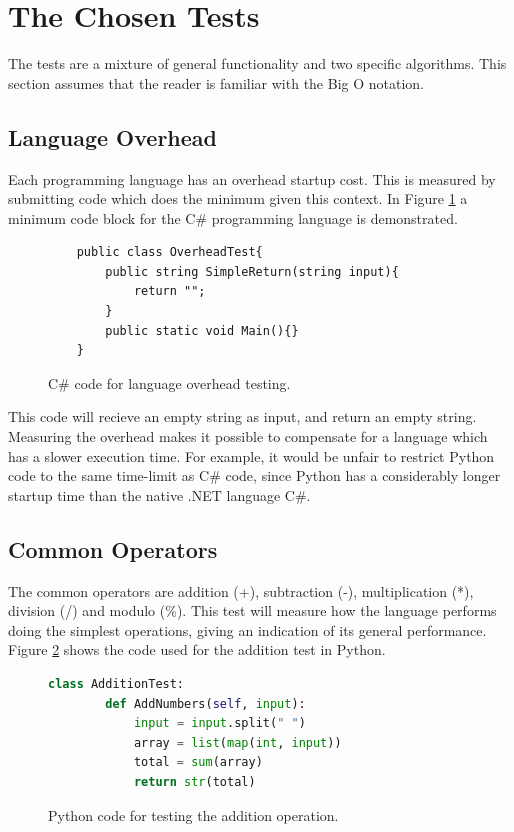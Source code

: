 \section{The Chosen Tests}
The tests are a mixture of general functionality and two specific algorithms. This section assumes that the reader is familiar with the Big O notation.

\subsection{Language Overhead}
Each programming language has an overhead startup cost. This is measured by submitting code which does the minimum given this context. In Figure \ref{fig:language_overhead} a minimum code block for the C\# programming language is demonstrated.

\begin{figure}[h]
	\lstset{style=sharpc}
	\begin{lstlisting}
	public class OverheadTest{
		public string SimpleReturn(string input){
			return "";
		}
		public static void Main(){}
	}
	\end{lstlisting}
	\caption{C\# code for language overhead testing.}
	\label{fig:language_overhead}
\end{figure}

This code will recieve an empty string as input, and return an empty string. Measuring the overhead makes it possible to compensate for a language which has a slower execution time. For example, it would be unfair to restrict Python code to the same time-limit as C\# code, since Python has a considerably longer startup time than the native .NET language C\#. 

\subsection{Common Operators}
The common operators are addition (+), subtraction (-), multiplication (*), division (/) and modulo (\%). This test will measure how the language performs doing the simplest operations, giving an indication of its general performance. Figure \ref{fig:addition_test} shows the code used for the addition test in Python.

\begin{figure}[h]
	\lstset{style=sharpc}
	\begin{lstlisting}[language=python]
	class AdditionTest:
	    def AddNumbers(self, input):
	        input = input.split(" ")
	        array = list(map(int, input))
	        total = sum(array)
	        return str(total)
	\end{lstlisting}
	\caption{Python code for testing the addition operation.}
	\label{fig:addition_test}
\end{figure}

